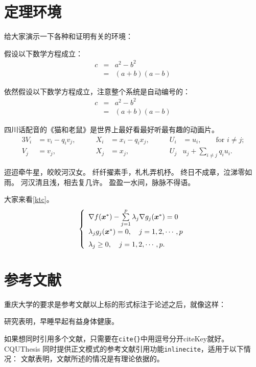 \section{定理环境}
\label{sec:theorem}

给大家演示一下各种和证明有关的环境：

\begin{assumption}
    假设以下数学方程成立：
    \begin{eqnarray}
    \label{eq:eqnxmp}
    c & = & a^2 - b^2\\
    & = & (a+b)(a-b)
    \end{eqnarray}
\end{assumption}

\begin{assumption}
    依然假设以下数学方程成立，注意整个系统是自动编号的：
    \begin{eqnarray}
    \label{eq:eqnxmp2}
    c & = & a^2 - b^2\\
    & = & (a+b)(a-b)
    \end{eqnarray}
\end{assumption}

\begin{cor}
    四川话配音的《猫和老鼠》是世界上最好看最好听最有趣的动画片。
    \begin{alignat}{3}
    V_i & =v_i - q_i v_j, & \qquad X_i & = x_i - q_i x_j,
    & \qquad U_i & = u_i,
    \qquad \text{for $i\ne j$;}\label{eq:B}\\
    V_j & = v_j, & \qquad X_j & = x_j,
    & \qquad U_j & u_j + \sum_{i\ne j} q_i u_i.
    \end{alignat}
\end{cor}

迢迢牵牛星，皎皎河汉女。
纤纤擢素手，札札弄机杼。
终日不成章，泣涕零如雨。
河汉清且浅，相去复几许。
盈盈一水间，脉脉不得语。

\begin{exmp}
    大家来看\autoref{ktc}。
    \begin{equation}
    \label{ktc}
    \left\{\begin{array}{l}
    \nabla f({\mbox{\boldmath $x$}}^*)-\sum\limits_{j=1}^p\lambda_j\nabla g_j({\mbox{\boldmath $x$}}^*)=0\\[0.3cm]
    \lambda_jg_j({\mbox{\boldmath $x$}}^*)=0,\quad j=1,2,\cdots,p\\[0.2cm]
    \lambda_j\ge 0,\quad j=1,2,\cdots,p.
    \end{array}\right.
    \end{equation}
\end{exmp}


\section{参考文献}
\label{sec:bib}
重庆大学的要求是参考文献以上标的形式标注于论述之后，就像这样：

研究表明\cite{r1}，早睡早起有益身体健康。

如果想同时引用多个文献\cite{r2,r3,r4,r6}，只需要在\verb|cite{}|中用逗号分开\textsf{citeKey}就好。
CQUThesis 同时提供正文模式的参考文献引用功能\texttt{inlinecite}，适用于以下情况：
文献表明，文献所述的情况是有理论依据的。
